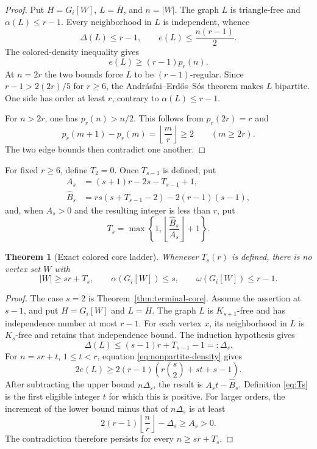 \documentclass[11pt,reqno,a4paper]{amsart}
\newtheorem{theorem}{Theorem}[section]
\theoremstyle{definition}
\theoremstyle{remark}
\newcommand{\comp}[1]{\overline{#1}}
\begin{document}
\begin{proof}
Put $H=G_i[W]$, $L=\comp H$, and $n=|W|$. The graph $L$ is
triangle-free and $\alpha(L)\leq r-1$. Every neighborhood in $L$ is
independent, whence
\[
  \Delta(L)\leq r-1,
  \qquad e(L)\leq\frac{n(r-1)}2.
\]
The colored-density inequality gives
\[
  e(L)\geq(r-1)p_r(n).
\]
At $n=2r$ the two bounds force $L$ to be $(r-1)$-regular. Since
$r-1>2(2r)/5$ for $r\geq6$, the Andr\'asfai--Erd\H{o}s--S\'os theorem
\cite{AndrasfaiErdosSos1974} makes $L$ bipartite. One side has order at least $r$, contrary to
$\alpha(L)\leq r-1$.

For $n>2r$, one has $p_r(n)>n/2$. This follows from $p_r(2r)=r$ and
\[
  p_r(m+1)-p_r(m)=\left\lfloor\frac mr\right\rfloor\geq2
  \qquad(m\geq2r).
\]
The two edge bounds then contradict one another.
\end{proof}

For fixed $r\geq6$, define $T_2=0$. Once $T_{s-1}$ is defined, put
\begin{align}
 A_s&=(s+1)r-2s-T_{s-1}+1,\label{eq:As}\\
 \widehat B_s&=rs(s+T_{s-1}-2)-2(r-1)(s-1),\label{eq:Bs}
\end{align}
and, when $A_s>0$ and the resulting integer is less than $r$, put
\begin{equation}\label{eq:Ts}
 T_s=\max\left\{1,
 \left\lfloor\frac{\widehat B_s}{A_s}\right\rfloor+1\right\}.
\end{equation}

\begin{theorem}[Exact colored core ladder]\label{thm:exact-ladder}
Whenever $T_s(r)$ is defined, there is no vertex set $W$ with
\[
 |W|\geq sr+T_s,
 \qquad \alpha(G_i[W])\leq s,
 \qquad \omega(G_i[W])\leq r-1.
\]
\end{theorem}

\begin{proof}
The case $s=2$ is Theorem~\ref{thm:terminal-core}. Assume the assertion
at $s-1$, and put $H=G_i[W]$ and $L=\comp H$. The graph $L$ is
$K_{s+1}$-free and has independence number at most $r-1$. For each
vertex $x$, its neighborhood in $L$ is $K_s$-free and retains that
independence bound. The induction hypothesis gives
\[
  \Delta(L)\leq(s-1)r+T_{s-1}-1=: \Delta_s.
\]
For $n=sr+t$, $1\leq t<r$, equation
\eqref{eq:nonpartite-density} gives
\[
  2e(L)\geq
  2(r-1)\left(r\binom s2+st+s-1\right).
\]
After subtracting the upper bound $n\Delta_s$, the result is
$A_st-\widehat B_s$. Definition \eqref{eq:Ts} is the first eligible
integer $t$ for which this is positive. For larger orders, the increment
of the lower bound minus that of $n\Delta_s$ is at least
\[
  2(r-1)\left\lfloor\frac nr\right\rfloor-\Delta_s
  \geq A_s>0.
\]
The contradiction therefore persists for every $n\geq sr+T_s$.
\end{proof}
\end{document}
